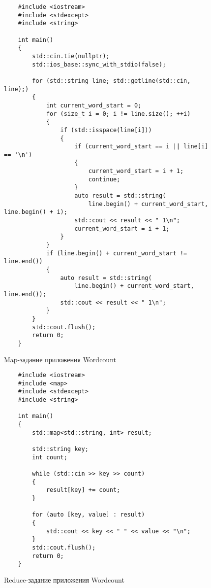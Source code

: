 \documentclass[../../thesis.tex]{subfile}
\begin{document}
    \begin{figure}[H]
    \begin{verbatim}
    #include <iostream>
    #include <stdexcept>
    #include <string>

    int main()
    {
        std::cin.tie(nullptr);
        std::ios_base::sync_with_stdio(false);

        for (std::string line; std::getline(std::cin, line);)
        {
            int current_word_start = 0;
            for (size_t i = 0; i != line.size(); ++i)
            {
                if (std::isspace(line[i]))
                {
                    if (current_word_start == i || line[i] == '\n')
                    {
                        current_word_start = i + 1;
                        continue;
                    }
                    auto result = std::string(
                        line.begin() + current_word_start, line.begin() + i);
                    std::cout << result << " 1\n";
                    current_word_start = i + 1;
                }
            }
            if (line.begin() + current_word_start != line.end())
            {
                auto result = std::string(
                    line.begin() + current_word_start, line.end());
                std::cout << result << " 1\n";
            }
        }
        std::cout.flush();
        return 0;
    }
    \end{verbatim}
    \caption{Map-задание приложения Wordcount}
    \label{lst:wordcount_mapper}
    \end{figure}


    \begin{figure}[H]
    \begin{verbatim}
    #include <iostream>
    #include <map>
    #include <stdexcept>
    #include <string>

    int main()
    {
        std::map<std::string, int> result;

        std::string key;
        int count;

        while (std::cin >> key >> count)
        {
            result[key] += count;
        }

        for (auto [key, value] : result)
        {
            std::cout << key << " " << value << "\n";
        }
        std::cout.flush();
        return 0;
    }

    \end{verbatim}
    \caption{Reduce-задание приложения Wordcount}
    \label{lst:wordcount_reducer}
    \end{figure}
\end{document}
